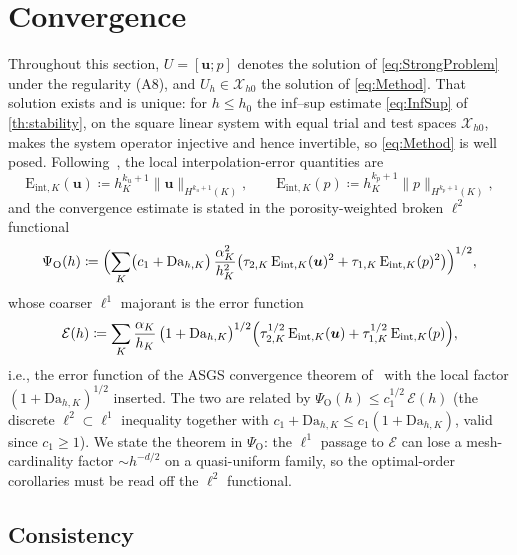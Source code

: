 \documentclass[11pt]{article}
\theoremstyle{remark}
\newcommand{\bu}{\boldsymbol{u}}
\newcommand{\norm}[1]{\lVert #1 \rVert}
\newcommand{\Eint}[2]{\mathrm{E}_{\mathrm{int},#1}(#2)}
\newcommand{\Dah}{\mathrm{Da}_{h,K}}
\newcommand{\Xhz}{\mathcal{X}_{h0}}
\begin{document}
\section{Convergence}
\label{sec:convergence}

Throughout this section, $U = [\bu; p]$ denotes the solution of
\cref{eq:StrongProblem} under the regularity (A8), and $U_h \in \Xhz$ the solution of
\cref{eq:Method}. That solution exists and is unique: for $h \le h_0$ the inf--sup estimate
\cref{eq:InfSup} of \cref{th:stability}, on the square linear system with equal trial and
test spaces $\Xhz$, makes the system operator injective and hence invertible, so
\cref{eq:Method} is well posed. Following~\cite{companion}, the local interpolation-error quantities
are
\begin{equation}
  \label{eq:EintDef}
  \Eint{K}{\bu} \coloneqq h_K^{k_u+1}\norm{\bu}_{H^{k_u+1}(K)},
  \qquad
  \Eint{K}{p} \coloneqq h_K^{k_p+1}\norm{p}_{H^{k_p+1}(K)},
\end{equation}
and the convergence estimate is stated in the porosity-weighted broken $\ell^2$
functional
\begin{equation}
  \label{eq:ErrorFunctionL2}
  \Psi_{\mathrm O}(h)
  \coloneqq
  \Bigl( \sum_K \bigl( c_1 + \Dah \bigr)\,\frac{\alpha_K^2}{h_K^2}
  \bigl( \tau_{2,K}\,\Eint{K}{\bu}^2 + \tau_{1,K}\,\Eint{K}{p}^2 \bigr) \Bigr)^{1/2},
\end{equation}
whose coarser $\ell^1$ majorant is the error function
\begin{equation}
  \label{eq:ErrorFunction}
  \mathcal{E}(h)
  \coloneqq
  \sum_K \frac{\alpha_K}{h_K}\,\bigl(1 + \Dah\bigr)^{1/2}
  \Bigl( \tau_{2,K}^{1/2}\,\Eint{K}{\bu} + \tau_{1,K}^{1/2}\,\Eint{K}{p} \Bigr),
\end{equation}
i.e., the error function of the ASGS convergence theorem of~\cite{companion} with the
local factor $(1+\Dah)^{1/2}$ inserted. The two are related by
$\Psi_{\mathrm O}(h) \le c_1^{1/2}\,\mathcal{E}(h)$ (the discrete $\ell^2\subset\ell^1$
inequality together with $c_1+\Dah \le c_1(1+\Dah)$, valid since $c_1 \ge 1$). We state the theorem in
$\Psi_{\mathrm O}$: the $\ell^1$ passage to $\mathcal{E}$ can lose a mesh-cardinality
factor $\sim h^{-d/2}$ on a quasi-uniform family, so the optimal-order corollaries
must be read off the $\ell^2$ functional.

\subsection{Consistency}
\end{document}
